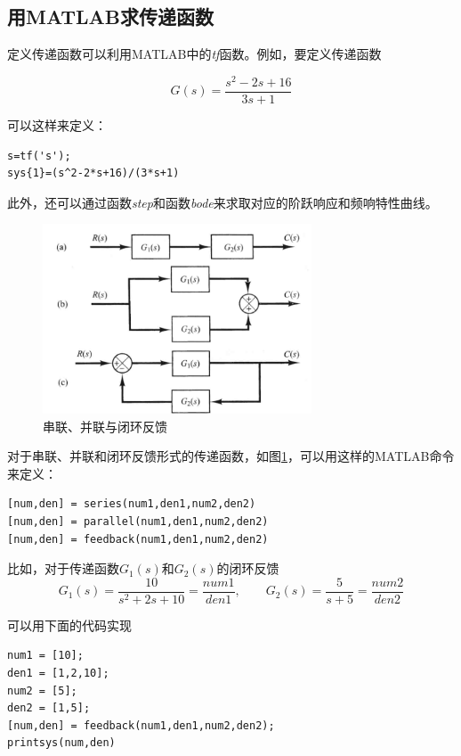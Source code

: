\subsection{用MATLAB求传递函数}

定义传递函数可以利用MATLAB中的\textit{tf}函数。例如，要定义传递函数

\begin{equation*}
	G(s)=\frac{s^2-2s+16}{3s+1}
\end{equation*}

可以这样来定义：

\begin{lstlisting}
s=tf('s');
sys{1}=(s^2-2*s+16)/(3*s+1)
\end{lstlisting}

此外，还可以通过函数\textit{step}和函数\textit{bode}来求取对应的阶跃响应和频响特性曲线。

\begin{figure}[!ht]
	\centering
	\includegraphics[width=8cm]{figures/1.png}
	\caption{串联、并联与闭环反馈}
	\label{1}
\end{figure}

对于串联、并联和闭环反馈形式的传递函数，如图\ref{1}，可以用这样的MATLAB命令来定义：

\begin{lstlisting}
[num,den] = series(num1,den1,num2,den2)
[num,den] = parallel(num1,den1,num2,den2)
[num,den] = feedback(num1,den1,num2,den2)
\end{lstlisting}

比如，对于传递函数$G_1(s)$和$G_2(s)$的闭环反馈
\begin{equation*}
G_1(s)=\frac{10}{s^2+2s+10}=\frac{num1}{den1},\hspace{2em}G_2(s)=\frac{5}{s+5}=\frac{num2}{den2}
\end{equation*}

可以用下面的代码实现

\begin{lstlisting}
num1 = [10];
den1 = [1,2,10];
num2 = [5];
den2 = [1,5];
[num,den] = feedback(num1,den1,num2,den2);
printsys(num,den)
\end{lstlisting}